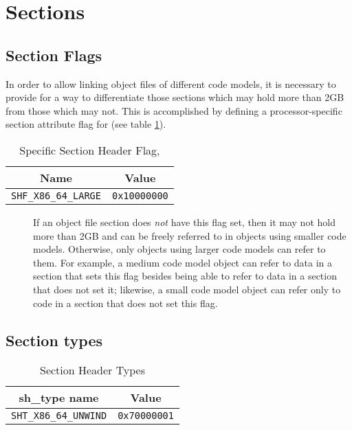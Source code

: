 \section{Sections}

\subsection{Section Flags}

In order to allow linking object files of different code models, it is
necessary to provide for a way to differentiate those sections which may hold
more than 2GB from those which may not. This is accomplished by defining a
processor-specific section attribute flag for 
(see table \ref{sh_flags}).

\begin{table}[H]
\Hrule
  \caption{\xARCH Specific Section Header Flag, }
  \label{sh_flags}
  \begin{center}
    \begin{tabular}[t]{l|l}
      \multicolumn{1}{c}{Name} & \multicolumn{1}{c}{Value} \\
      \hline
      \texttt{SHF_X86_64_LARGE} & \texttt{0x10000000}
    \end{tabular}
  \end{center}
\Hrule
\end{table}

\begin{description}
 \item[] If an object file section does
   {\em not} have
   this flag set, then it may not hold more than 2GB and
   can be freely referred to in objects using smaller code models.
   Otherwise, only objects using larger code models can refer to them.
   For example, a medium code model object can refer to data in a
   section that sets this flag besides being able to refer to data in a
   section that does not set it; likewise, a small code model object can
   refer only to code in a section that does not set this flag.
\end{description}

\subsection{Section types}

\begin{table}[H]
\Hrule
  \caption{Section Header Types}
  \begin{center}
    \begin{tabular}[t]{l|l}
      \multicolumn{1}{c}{sh_type name} & \multicolumn{1}{c}{Value} \\
      \hline
      \texttt{SHT_X86_64_UNWIND} & \texttt{0x70000001}
    \end{tabular}
  \end{center}
\Hrule
\end{table}

